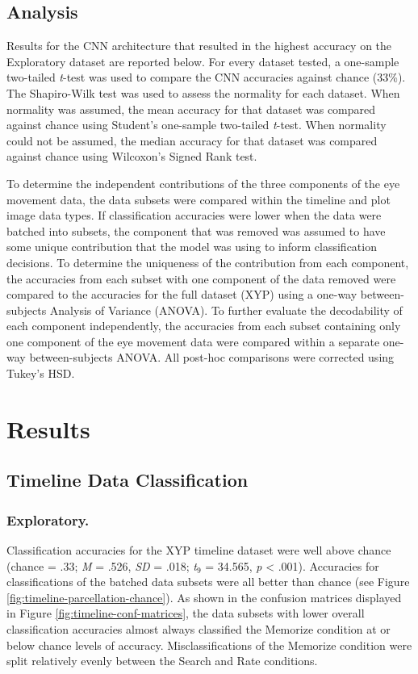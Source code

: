 \documentclass[
  english,
  man, donotrepeattitle,floatsintext]{apa6}
\begin{document}
\subsection{Analysis}

Results for the CNN architecture that resulted in the highest accuracy on the Exploratory dataset are reported below. For every dataset tested, a one-sample two-tailed \emph{t}-test was used to compare the CNN accuracies against chance (33\%). The Shapiro-Wilk test was used to assess the normality for each dataset. When normality was assumed, the mean accuracy for that dataset was compared against chance using Student's one-sample two-tailed \emph{t}-test. When normality could not be assumed, the median accuracy for that dataset was compared against chance using Wilcoxon's Signed Rank test.

To determine the independent contributions of the three components of the eye movement data, the data subsets were compared within the timeline and plot image data types. If classification accuracies were lower when the data were batched into subsets, the component that was removed was assumed to have some unique contribution that the model was using to inform classification decisions. To determine the uniqueness of the contribution from each component, the accuracies from each subset with one component of the data removed were compared to the accuracies for the full dataset (XYP) using a one-way between-subjects Analysis of Variance (ANOVA). To further evaluate the decodability of each component independently, the accuracies from each subset containing only one component of the eye movement data were compared within a separate one-way between-subjects ANOVA. All post-hoc comparisons were corrected using Tukey's HSD.

\section{Results}
\subsection{Timeline Data Classification}
\subsubsection{Exploratory.}

Classification accuracies for the XYP timeline dataset were well above chance (chance = .33; \emph{M} = .526, \emph{SD} = .018; \emph{t}\(_{9}\) = 34.565, \emph{p} \textless{} .001). Accuracies for classifications of the batched data subsets were all better than chance (see Figure \ref{fig:timeline-parcellation-chance}). As shown in the confusion matrices displayed in Figure \ref{fig:timeline-conf-matrices}, the data subsets with lower overall classification accuracies almost always classified the Memorize condition at or below chance levels of accuracy. Misclassifications of the Memorize condition were split relatively evenly between the Search and Rate conditions.
\end{document}
